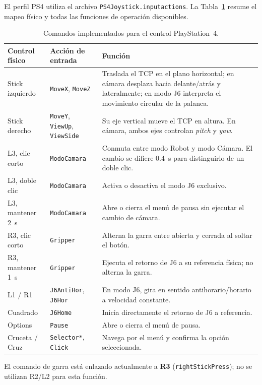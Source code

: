El perfil PS4 utiliza el archivo \texttt{PS4Joystick.inputactions}. La
Tabla~\ref{tab:ps4_commands} resume el mapeo físico y todas las funciones de
operación disponibles.

\begin{table}[H]
\centering
\small
\setlength{\tabcolsep}{4pt}
\renewcommand{\arraystretch}{1.18}
\caption{Comandos implementados para el control PlayStation~4.}
\label{tab:ps4_commands}
\begin{tabular}{p{3.0cm}p{3.2cm}p{9.4cm}}
\hline
\textbf{Control físico} & \textbf{Acción de entrada} & \textbf{Función} \\
\hline
Stick izquierdo & \texttt{MoveX}, \texttt{MoveZ} & Traslada el TCP en el plano horizontal; en cámara desplaza hacia delante/atrás y lateralmente; en modo J6 interpreta el movimiento circular de la palanca. \\
Stick derecho & \texttt{MoveY}, \texttt{ViewUp}, \texttt{ViewSide} & Su eje vertical mueve el TCP en altura. En cámara, ambos ejes controlan \textit{pitch} y \textit{yaw}. \\
L3, clic corto & \texttt{ModoCamara} & Conmuta entre modo Robot y modo Cámara. El cambio se difiere \SI{0.4}{\second} para distinguirlo de un doble clic. \\
L3, doble clic & \texttt{ModoCamara} & Activa o desactiva el modo J6 exclusivo. \\
L3, mantener \SI{2}{\second} & \texttt{ModoCamara} & Abre o cierra el menú de pausa sin ejecutar el cambio de cámara. \\
R3, clic corto & \texttt{Gripper} & Alterna la garra entre abierta y cerrada al soltar el botón. \\
R3, mantener \SI{1}{\second} & \texttt{Gripper} & Ejecuta el retorno de J6 a su referencia física; no alterna la garra. \\
L1 / R1 & \texttt{J6AntiHor}, \texttt{J6Hor} & En modo J6, gira en sentido antihorario/horario a velocidad constante. \\
Cuadrado & \texttt{J6Home} & Inicia directamente el retorno de J6 a referencia. \\
Options & \texttt{Pause} & Abre o cierra el menú de pausa. \\
Cruceta / Cruz & \texttt{Selector*}, \texttt{Click} & Navega por el menú y confirma la opción seleccionada. \\
\hline
\end{tabular}
\end{table}

El comando de garra está enlazado actualmente a \textbf{R3}
(\texttt{rightStickPress}); no se utilizan R2/L2 para esta función.

